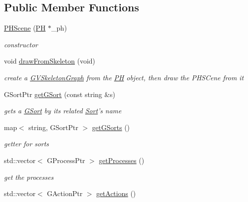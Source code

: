 \subsection*{Public Member Functions}
\begin{DoxyCompactItemize}
\item 
\hyperlink{classPHScene_ab911261388ccc14254980b5d01909d61}{P\+H\+Scene} (\hyperlink{classPH}{P\+H} $\ast$\+\_\+ph)
\begin{DoxyCompactList}\small\item\em constructor \end{DoxyCompactList}\item 
\hypertarget{classPHScene_a8c1d06d0ad738207ecb8754537954ed5}{void \hyperlink{classPHScene_a8c1d06d0ad738207ecb8754537954ed5}{draw\+From\+Skeleton} (void)}\label{classPHScene_a8c1d06d0ad738207ecb8754537954ed5}

\begin{DoxyCompactList}\small\item\em create a \hyperlink{classGVSkeletonGraph}{G\+V\+Skeleton\+Graph} from the \hyperlink{classPH}{P\+H} object, then draw the P\+H\+S\+Cene from it \end{DoxyCompactList}\item 
G\+Sort\+Ptr \hyperlink{classPHScene_ae8be020b063c06f135d644937d65147b}{get\+G\+Sort} (const string \&s)
\begin{DoxyCompactList}\small\item\em gets a \hyperlink{classGSort}{G\+Sort} by its related \hyperlink{classSort}{Sort}'s name \end{DoxyCompactList}\item 
\hypertarget{classPHScene_a4c7995ab5b0807000aa1234edbb44794}{map$<$ string, G\+Sort\+Ptr $>$ \hyperlink{classPHScene_a4c7995ab5b0807000aa1234edbb44794}{get\+G\+Sorts} ()}\label{classPHScene_a4c7995ab5b0807000aa1234edbb44794}

\begin{DoxyCompactList}\small\item\em getter for sorts \end{DoxyCompactList}\item 
\hypertarget{classPHScene_a89518baed691958147d7f55a25d14f9c}{std\+::vector$<$ G\+Process\+Ptr $>$ \hyperlink{classPHScene_a89518baed691958147d7f55a25d14f9c}{get\+Processes} ()}\label{classPHScene_a89518baed691958147d7f55a25d14f9c}

\begin{DoxyCompactList}\small\item\em get the processes \end{DoxyCompactList}\item 
\hypertarget{classPHScene_a4cf1a2937e804ad79a0c490f7be6ef45}{std\+::vector$<$ G\+Action\+Ptr $>$ \hyperlink{classPHScene_a4cf1a2937e804ad79a0c490f7be6ef45}{get\+Actions} ()}\label{classPHScene_a4cf1a2937e804ad79a0c490f7be6ef45}


\end{DoxyCompactItemize}
